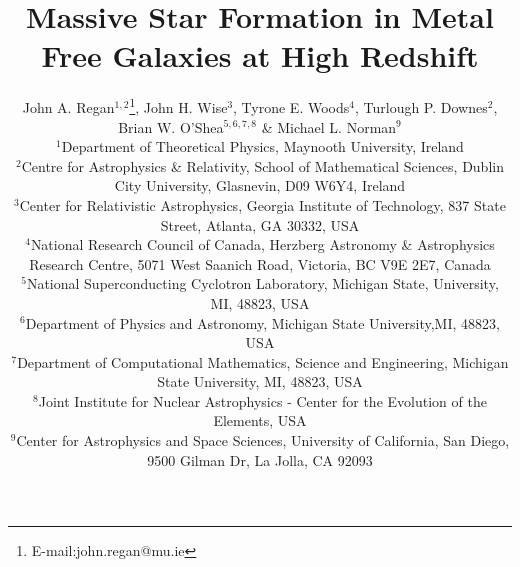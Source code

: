 \documentclass[graphics, twocolumn, usenatbib]{mn2e}
\begin{document}
\title{Massive Star Formation in Metal Free Galaxies at High Redshift}
\author[J. A. Regan, J. H. Wise,  T. E. Woods, T.P. Downes, B.W. O'Shea \&  M.L. Norman]{John A. Regan$^{1,2}$\thanks{E-mail:john.regan@mu.ie},
  John H. Wise$^{3}$, Tyrone E. Woods$^{4}$, Turlough P. Downes$^{2}$, \newauthor Brian W. O'Shea$^{5,6,7,8}$ \& Michael L. Norman$^9$\\
  $^1$Department of Theoretical Physics, Maynooth University, Ireland\\
  $^2$Centre for Astrophysics \& Relativity, School of Mathematical Sciences, Dublin City University, Glasnevin, D09 W6Y4, Ireland\\
  $^3$Center for Relativistic Astrophysics, Georgia Institute of Technology, 837 State Street, Atlanta, GA 30332, USA\\
  $^4$National Research Council of Canada, Herzberg Astronomy \& Astrophysics Research Centre, 5071 West Saanich Road, Victoria, BC V9E 2E7, Canada\\
  $^5$National Superconducting Cyclotron Laboratory, Michigan State, University, MI, 48823, USA\\
  $^6$Department of Physics and Astronomy, Michigan State University,MI, 48823, USA\\
  $^7$Department of Computational Mathematics, Science and Engineering, Michigan State University, MI, 48823, USA\\    
  $^8$Joint Institute for Nuclear Astrophysics - Center for the Evolution of the Elements, USA\\
  $^9$Center for Astrophysics and Space Sciences, University of California, San Diego, 9500 Gilman Dr, La Jolla, CA 92093\\}

\label{firstpage}
\pagerange{\pageref{firstpage}--\pageref{lastpage}}
\maketitle
\end{document}
